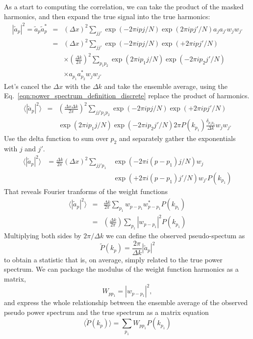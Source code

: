  As a start to computing the correlation, we can take the product of the masked harmonics, and then expand the true signal into the true harmonics:
 \begin{eqnarray}
   |\tilde a_p |^2 = \tilde a_p \tilde a_p^* &=&  (\Delta x)^2 \sum_{jj'} \exp(-2\pi i pj/N) \exp(2\pi i pj'/N) a_j  a_{j'} w_j w_{j'}  \nonumber \\
   &=&  (\Delta x)^2 \sum_{jj'} \exp(-2\pi i pj/N) \exp(+2\pi i pj'/N) \nonumber \\
   & & \times   \left(\frac{\Delta k}{2\pi}\right)^2 \sum_{p_1 p_2}  \exp(2\pi i p_1 j/N) \exp(-2\pi i p_2 j'/N) \nonumber \\
   & & \times a_{p_1} a^*_{p_2} w_j w_{j'}
 \end{eqnarray}
Let's cancel the $\Delta x$ with the $\Delta k$ and take the ensemble average, using the Eq.~\ref{eqn:power_spectrum_definition_discrete} replace the product of harmonics.
 \begin{eqnarray}
 \langle  |\tilde a_p |^2 \rangle &=& \left(\frac{\Delta x\Delta k}{2\pi}\right)^2  \sum_{jj'p_1p_2} \exp(-2\pi i pj/N)  \exp(+2\pi i pj'/N) \nonumber \\
 & & \exp(2\pi i p_1 j/N) \exp(-2\pi i p_2 j'/N){2\pi} P(k_{p_1}) \frac{\delta_{p_1 p_2}}{\Delta k} w_j w_{j'}
 \end{eqnarray}
Use the delta function to sum over $p_2$ and separately gather the exponentials with $j$ and $j'$.  
\begin{eqnarray}
 \langle   |\tilde a_p |^2 \rangle &= \frac{\Delta k}{2\pi}\left(\Delta x \right)^2  \sum_{jj'p_1}& \exp(-2\pi i (p-p_1)j/N)  w_j \nonumber \\
  & &  \exp(+2\pi i (p-p_1) j'/N)  w_{j'}   P(k_{p_1})
\end{eqnarray}
That reveals Fourier tranforms of the weight functions
\begin{eqnarray}
  \langle  |\tilde a_p |^2 \rangle &=& \frac{\Delta k}{2\pi}  \sum_{p_1} w_{p-p_1} w_{p-p_1}^*  P(k_{p_1}) \\
  &=& \left(\frac{\Delta k}{2\pi}\right)  \sum_{p_1} |w_{p-p_1}|^2  P(k_{p_1})
\end{eqnarray}
Multiplying both sides by $2\pi/\Delta k$ we can define the observed pseudo-spectum as
\begin{equation}
  \tilde P(k_p) = \frac{2\pi}{\Delta k} |\tilde a_p |^2
\end{equation}
to obtain a statistic that is, on average, simply related to the true power spectrum. We can package the modulus of the weight function harmonics as a matrix,
\begin{equation}
  W_{pp_1} =  |w_{p-p_1}|^2,
\end{equation}
and express the whole relationship between the ensemble average of the observed pseudo power spectrum and the true spectrum as a matrix equation
\begin{equation}
  \langle \tilde P(k_p) \rangle =  \sum_{p_1} W_{pp_1}  P(k_{p_1})
\end{equation}

